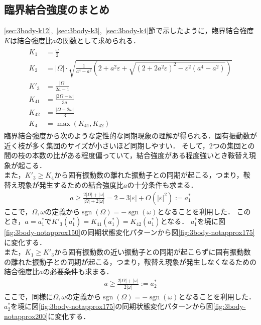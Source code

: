 \documentclass[../main]{subfiles}
\begin{document}
    \subsection{臨界結合強度のまとめ}
    \label{sec:3body-summary}
    \ref{sec:3body-k12},\ \ref{sec:3body-k3},\ \ref{sec:3body-k4}節で示したように，臨界結合強度$K$は結合強度比$a$の関数として求められる．
    \begin{align}
        \label{eq:3body-matome}
        \begin{split}
            K_1&=\frac{\omega}{2}\\
            K_2&=|\Omega|\cdot\sqrt{\frac{1}{a^4-a^2}\left(2+a^2\varepsilon+\sqrt{(2+2a^2\varepsilon)^2-\varepsilon^2(a^4-a^2)}\right)}\\
            K'_3&=\frac{|\Omega|}{2a-1}\\
            K_{41}&=\frac{|2\Omega-\omega|}{3a}\\
            K_{42}&=\frac{|\Omega-2\omega|}{3}\\
            K_4&=\max\left(K_{41},K_{42}\right)
        \end{split}
    \end{align}
    臨界結合強度から次のような定性的な同期現象の理解が得られる．固有振動数が近く枝が多く集団のサイズが小さいほど同期しやすい．
    そして，2つの集団との間の枝の本数の比がある程度偏っていて，結合強度がある程度強いとき鞍替え現象が起こる．\\
    また，$K'_3\geq K_4$から固有振動数の離れた振動子との同期が起こる，つまり，鞍替え現象が発生するための結合強度比$a$の十分条件も求まる．
    \begin{align*}
        a\geq \frac{2|\Omega|+|\omega|}{|\Omega|+2|\omega|}= 2-3|\varepsilon|+O(|\varepsilon|^2):=a^\ast_1    
    \end{align*}
    ここで，$\Omega,\omega$の定義から$\operatorname{sgn}(\Omega)=-\operatorname{sgn}(\omega)$となることを利用した．
    このとき，$a=a^\ast_1$で$K'_{3}(a^\ast_1)=K_{41}(a^\ast_1)=K_{42}(a^\ast_1)$となる．
    $a^\ast_1$を境に図\ref{fig:3body-notapprox150}の同期状態変化パターンから図\ref{fig:3body-notapprox175}に変化する．\\
    また，$K_1\geq K'_3$から固有振動数の近い振動子との同期が起こらずに固有振動数の離れた振動子との同期が起こる，つまり，鞍替え現象が発生しなくなるための結合強度比$a$の必要条件も求まる．
    \begin{align*}
        a\geq \frac{2|\Omega|+|\omega|}{2|\omega|}:=a^\ast_2    
    \end{align*}
    ここで，同様に$\Omega,\omega$の定義から$\operatorname{sgn}(\Omega)=-\operatorname{sgn}(\omega)$となることを利用した．
    $a^\ast_2$を境に図\ref{fig:3body-notapprox175}の同期状態変化パターンから図\ref{fig:3body-notapprox200}に変化する．
\end{document}
